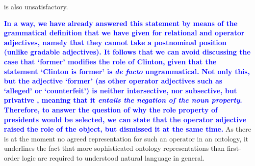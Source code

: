 \documentclass[11pt]{article}
\begin{document}
is also unsatisfactory. {\textbf{\textcolor{blue}{In a way, we have already answered this statement by means of the grammatical definition that we have given for relational and operator adjectives, namely that they cannot take a postnominal position (unlike gradable adjectives). It follows that we can avoid discussing the case that `former' modifies the role of Clinton, given that the statement `Clinton is former' is \textit{de facto} ungrammatical. Not only this, but the adjective `former' (as other operator adjectives such as `alleged' or `counterfeit') is neither intersective, nor subsective, but privative \cite{partee2001privative}, meaning that it \textit{entails the negation of the noun property}. Therefore, to answer the question of why the role property of presidents would be selected, we can state that the operator adjective raised the role of the object, but dismissed it at the same time.}}
As there is at the moment no agreed representation for such an operator in an
ontology, it underlines the fact that more sophisticated ontology representations than first-order logic are required to understood natural
language in general.

}
\end{document}
